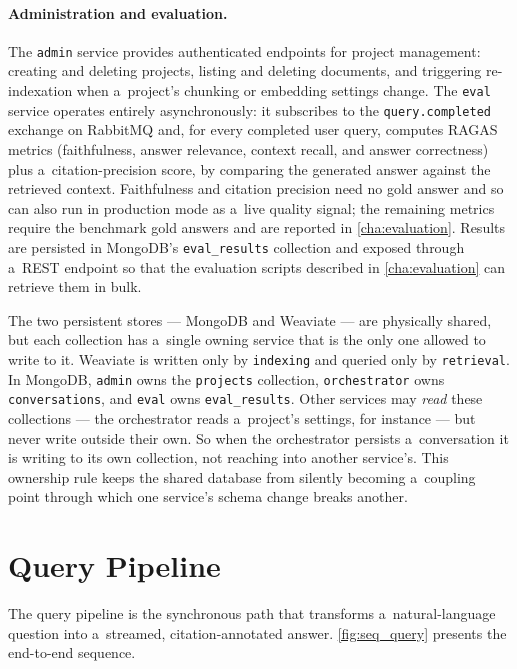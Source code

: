 \paragraph{Administration and evaluation.}
The \texttt{admin} service provides authenticated endpoints for project
management: creating and deleting projects, listing and deleting documents,
and triggering re-indexation when a~project's chunking or embedding settings
change.  The \texttt{eval} service operates entirely asynchronously: it
subscribes to the \texttt{query.completed} exchange on RabbitMQ and, for
every completed user query, computes RAGAS metrics (faithfulness, answer
relevance, context recall, and answer correctness) plus a~citation-precision
score, by comparing the generated answer against the retrieved context.
Faithfulness and citation precision need no gold answer and so can also run in
production mode as a~live quality signal; the remaining metrics require the
benchmark gold answers and are reported in \cref{cha:evaluation}.  Results are persisted in MongoDB's
\texttt{eval\_results} collection and exposed through a~REST endpoint so
that the evaluation scripts described in \cref{cha:evaluation} can
retrieve them in bulk.

The two persistent stores --- MongoDB and Weaviate --- are physically shared, but
each collection has a~single owning service that is the only one allowed to write
to it.  Weaviate is written only by \texttt{indexing} and queried only by
\texttt{retrieval}.  In MongoDB, \texttt{admin} owns the \texttt{projects}
collection, \texttt{orchestrator} owns \texttt{conversations}, and \texttt{eval}
owns \texttt{eval\_results}.  Other services may \emph{read} these collections
--- the orchestrator reads a~project's settings, for instance --- but never write
outside their own.  So when the orchestrator persists a~conversation it is writing
to its own collection, not reaching into another service's.  This ownership rule
keeps the shared database from silently becoming a~coupling point through which
one service's schema change breaks another.

\section{Query Pipeline}
\label{sec:query_pipeline}

The query pipeline is the synchronous path that transforms a~natural-language
question into a~streamed, citation-annotated answer.
\cref{fig:seq_query} presents the end-to-end sequence.

